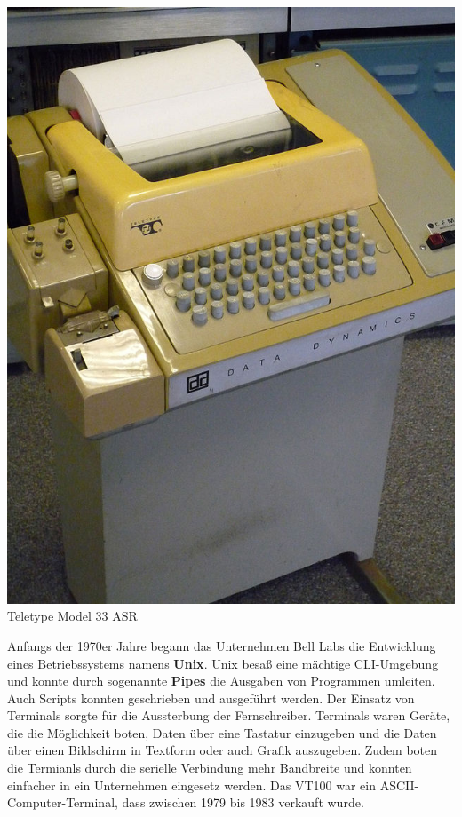 \documentclass[12pt,a4paper]{report}
\begin{document}
\begin{onehalfspace}
\begin{center}
\includegraphics[scale=0.52]{img/teletype.jpg}\\
Teletype Model 33 ASR \cite{wiki08}
\end{center}

Anfangs der 1970er Jahre begann das Unternehmen Bell Labs die Entwicklung eines Betriebssystems namens \textbf{Unix}. Unix besaß eine mächtige CLI-Umgebung und konnte durch sogenannte \textbf{Pipes} die Ausgaben von Programmen umleiten. Auch Scripts konnten geschrieben und ausgeführt werden. Der Einsatz von Terminals sorgte für die Aussterbung der Fernschreiber. Terminals waren Geräte, die die Möglichkeit boten, Daten über eine Tastatur einzugeben und die Daten über einen Bildschirm in Textform oder auch Grafik auszugeben. Zudem boten die Termianls durch die serielle Verbindung mehr Bandbreite und konnten einfacher in ein Unternehmen eingesetz werden. Das VT100 war ein ASCII-Computer-Terminal, dass zwischen 1979 bis 1983 verkauft wurde.\\


\end{onehalfspace}
\end{document}
